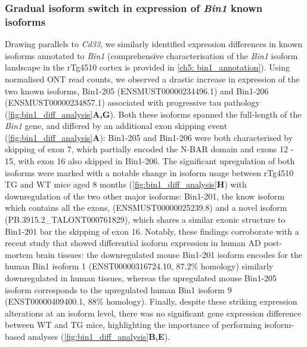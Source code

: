 \subsubsection{Gradual isoform switch in expression of \textit{Bin1} known isoforms}
\label{bin1_diff}
Drawing parallels to \textit{Cd33}, we similarly identified expression differences in known isoforms annotated to \textit{Bin1} (comprehensive characterisation of the \textit{Bin1} isoform landscape in the rTg4510 cortex is provided in \cref{ch5: bin1_annotation}). Using normalised ONT read counts, we observed a drastic increase in expression of the two known isoforms, Bin1-205 (ENSMUST00000234496.1) and Bin1-206 (ENSMUST00000234857.1) associated with progressive tau pathology (\cref{fig:bin1_diff_analysis}\textbf{A,G}). Both these isoforms spanned the full-length of the \textit{Bin1} gene, and differed by an additional exon skipping event (\cref{fig:bin1_diff_analysis}\textbf{A}): Bin1-205 and Bin1-206 were both characterised by skipping of exon 7, which partially encoded the N-BAR domain and exons 12 - 15, with exon 16 also skipped in Bin1-206. The significant upregulation of both isoforms were marked with a notable change in isoform usage between rTg4510 TG and WT mice aged 8 months (\cref{fig:bin1_diff_analysis}\textbf{H}) with downregulation of the two other major isoforms: Bin1-201, the know isoform which contains all the exons, (ENSMUST00000025239.8) and a novel isoform (PB.3915.2\_TALONT000761829), which shares a similar exonic structure to Bin1-201 bar the skipping of exon 16. Notably, these findings corroborate with a recent study that showed differential isoform expression in human AD post-mortem brain tissues\cite{Taga2020}: the downregulated mouse Bin1-201 isoform encodes for the human Bin1 isoform 1 (ENST00000316724.10, 87.2\% homology) similarly downregulated in human tissues, whereas the upregulated mouse Bin1-205 isoform corresponds to the upregulated human Bin1 isoform 9 (ENST00000409400.1, 88\% homology). Finally, despite these striking expression alterations at an isoform level, there was no significant gene expression difference between WT and TG mice, highlighting the importance of performing isoform-based analyses (\cref{fig:bin1_diff_analysis}\textbf{B,E}). 

